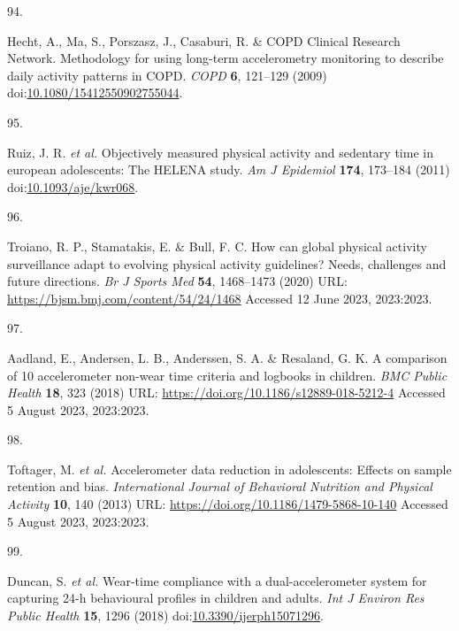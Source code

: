 \documentclass[
  10pt,
]{scrbook}
\newlength{\cslhangindent}
\newlength{\csllabelwidth}
\newlength{\cslentryspacingunit} %
\newenvironment{CSLReferences}[2] %
 {%
  \setlength{\parindent}{0pt}
  \ifodd #1
  \let\oldpar\par
  \def\par{\hangindent=\cslhangindent\oldpar}
  \fi
  \setlength{\parskip}{#2\cslentryspacingunit}
 }%
 {}
\newcommand{\CSLLeftMargin}[1]{\parbox[t]{\csllabelwidth}{#1}}
\newcommand{\CSLRightInline}[1]{\parbox[t]{\linewidth - \csllabelwidth}{#1}\break}
\begin{document}
\begin{CSLReferences}{0}{0}
\leavevmode{}%
\CSLLeftMargin{94. }%
\CSLRightInline{Hecht, A., Ma, S., Porszasz, J., Casaburi, R. \& COPD
Clinical Research Network. Methodology for using long-term accelerometry
monitoring to describe daily activity patterns in {COPD}. \emph{{COPD}}
\textbf{6}, 121--129 (2009)
doi:\href{https://doi.org/10.1080/15412550902755044}{10.1080/15412550902755044}.}

\leavevmode{}%
\CSLLeftMargin{95. }%
\CSLRightInline{Ruiz, J. R. \emph{et al.} Objectively measured physical
activity and sedentary time in european adolescents: The {HELENA} study.
\emph{Am J Epidemiol} \textbf{174}, 173--184 (2011)
doi:\href{https://doi.org/10.1093/aje/kwr068}{10.1093/aje/kwr068}.}

\leavevmode{}%
\CSLLeftMargin{96. }%
\CSLRightInline{Troiano, R. P., Stamatakis, E. \& Bull, F. C. How can
global physical activity surveillance adapt to evolving physical
activity guidelines? Needs, challenges and future directions. \emph{Br J
Sports Med} \textbf{54}, 1468--1473 (2020) URL:
\url{https://bjsm.bmj.com/content/54/24/1468} Accessed 12 June 2023,
2023:2023.}

\leavevmode{}%
\CSLLeftMargin{97. }%
\CSLRightInline{Aadland, E., Andersen, L. B., Anderssen, S. A. \&
Resaland, G. K. A comparison of 10 accelerometer non-wear time criteria
and logbooks in children. \emph{{BMC} Public Health} \textbf{18}, 323
(2018) URL: \url{https://doi.org/10.1186/s12889-018-5212-4} Accessed 5
August 2023, 2023:2023.}

\leavevmode{}%
\CSLLeftMargin{98. }%
\CSLRightInline{Toftager, M. \emph{et al.} Accelerometer data reduction
in adolescents: Effects on sample retention and bias.
\emph{International Journal of Behavioral Nutrition and Physical
Activity} \textbf{10}, 140 (2013) URL:
\url{https://doi.org/10.1186/1479-5868-10-140} Accessed 5 August 2023,
2023:2023.}

\leavevmode{}%
\CSLLeftMargin{99. }%
\CSLRightInline{Duncan, S. \emph{et al.} Wear-time compliance with a
dual-accelerometer system for capturing 24-h behavioural profiles in
children and adults. \emph{Int J Environ Res Public Health} \textbf{15},
1296 (2018)
doi:\href{https://doi.org/10.3390/ijerph15071296}{10.3390/ijerph15071296}.}


\end{CSLReferences}
\end{document}

